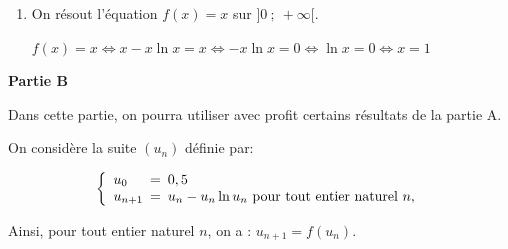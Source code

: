 \documentclass[10pt]{article}
\begin{document}
\begin{enumerate}
\begin{enumerate}
$f(1) = 1 -\ln 1=1$; on établit le tableau des variations de la fonction $f$:		
		
\begin{center}
{\renewcommand{\arraystretch}{1.3}
\def\esp{\hspace*{2.5cm}}
\def\hauteur{0pt}
$\begin{array}{|c|l*4{c}|}
\hline
x 		& 0  & \esp & 1 & \esp & +\infty \\\hline
f'(x) 	& \vline\;\vline &   \pmb{+} & \vline\hspace{-2.7pt}0 & \pmb{-} & \\\hline
 		&  \vline\;\vline & & \Rnode{max}{1}  & & \\
f(x) &\vline\;\vline & &  & & \rule{0pt}{\hauteur} \\
 &\vline\;\vline \Rnode{min1}{~0} & & & & \Rnode{min2}{-\infty} \rule{0pt}{\hauteur}    
 \ncline{->}{min1}{max}
 \ncline{->}{max}{min2}\\ \hline
\end{array} $
}
\end{center}	
		
	\end{enumerate}
\item On résout l'équation $f(x) = x$ sur $]0~;~+\infty[$.

$f(x)=x \iff x - x\ln x = x \iff -x \ln x=0 \iff \ln x = 0 \iff x = 1$
\end{enumerate}

\bigskip

\textbf{Partie B}

\medskip

Dans cette partie, on pourra utiliser avec profit certains résultats de la partie A. 

On considère la suite $\left(u_n\right)$ définie par:

\[\left\{\begin{array}{l !{=} l}
u_0 & 0,5\\
u_{n+1} & u_n - u_n \ln u_n \text{ pour tout entier naturel } n,
\end{array}\right.\]

Ainsi, pour tout entier naturel $n$, on a : $u_{n+1} = f\left(u_n\right)$.
\end{document}
